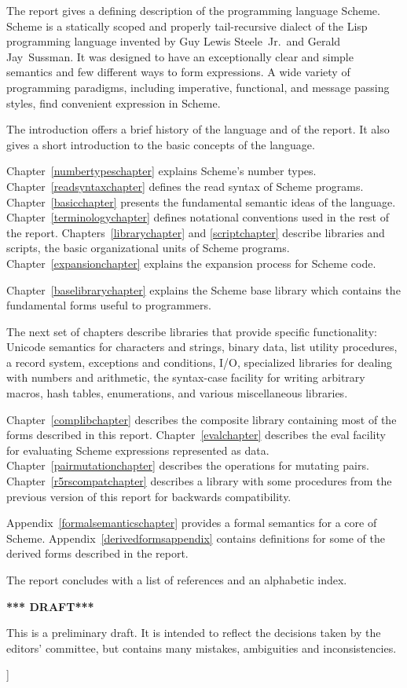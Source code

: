 {The report gives a defining description of the programming language
Scheme.  Scheme is a statically scoped and properly tail-recursive
dialect of the Lisp programming language invented by Guy Lewis
Steele~Jr.\ and Gerald Jay~Sussman.  It was designed to have an
exceptionally clear and simple semantics and few different ways to
form expressions.  A wide variety of programming paradigms, including
imperative, functional, and message passing styles, find convenient
expression in Scheme.

The introduction offers a brief history of the language and of
the report.  It also gives a short introduction to the basic concepts
of the language.

Chapter~\ref{numbertypeschapter} explains Scheme's number types.
Chapter~\ref{readsyntaxchapter} defines the read syntax of Scheme
programs.  Chapter~\ref{basicchapter} presents the fundamental
semantic ideas of the language.  Chapter~\ref{terminologychapter}
defines notational conventions used in the rest of the report.
Chapters~\ref{librarychapter} and \ref{scriptchapter} describe
libraries and scripts, the basic organizational units of Scheme
programs.  Chapter~\ref{expansionchapter} explains the expansion
process for Scheme code.

Chapter~\ref{baselibrarychapter} explains the Scheme base library which
contains the fundamental forms useful to programmers.

The next set of chapters describe libraries that provide specific
functionality:
Unicode semantics for characters and strings,
binary data,
list utility procedures,
a record system,
exceptions and conditions,
I/O,
specialized libraries for dealing with numbers and arithmetic,
the {\cf syntax-case} facility for writing arbitrary macros,
hash tables,
enumerations,
and various miscellaneous libraries.

Chapter~\ref{complibchapter} describes the composite library
containing most of the forms described in this report.
Chapter~\ref{evalchapter} describes the {\cf eval} facility for
evaluating Scheme expressions represented as data.
Chapter~\ref{pairmutationchapter} describes the operations for
mutating pairs.  Chapter~\ref{r5rscompatchapter} describes a library
with some procedures from the previous
version of this report for backwards compatibility.

Appendix~\ref{formalsemanticschapter} provides a formal semantics for a
core of Scheme.  Appendix~\ref{derivedformsappendix} contains
definitions for some of the derived forms described in the report.

\vest The report concludes with a list of references and an
alphabetic index.

\bigskip

\begin{center}
{\large \bf
*** DRAFT*** \\
}\end{center}

This is a preliminary draft.  It is intended to reflect the decisions
taken by the editors' committee, but contains many mistakes,
ambiguities and inconsistencies.

}]

